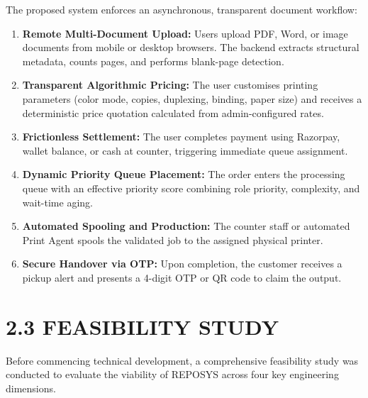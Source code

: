 \documentclass[12pt,a4paper,oneside]{report}
\begin{document}
The proposed system enforces an asynchronous, transparent document workflow:
\begin{enumerate}[leftmargin=0.35in, itemsep=2pt]
  \item \textbf{Remote Multi-Document Upload:} Users upload PDF, Word, or image documents from mobile or desktop browsers. The backend extracts structural metadata, counts pages, and performs blank-page detection.
  \item \textbf{Transparent Algorithmic Pricing:} The user customises printing parameters (color mode, copies, duplexing, binding, paper size) and receives a deterministic price quotation calculated from admin-configured rates.
  \item \textbf{Frictionless Settlement:} The user completes payment using Razorpay, wallet balance, or cash at counter, triggering immediate queue assignment.
  \item \textbf{Dynamic Priority Queue Placement:} The order enters the processing queue with an effective priority score combining role priority, complexity, and wait-time aging.
  \item \textbf{Automated Spooling and Production:} The counter staff or automated Print Agent spools the validated job to the assigned physical printer.
  \item \textbf{Secure Handover via OTP:} Upon completion, the customer receives a pickup alert and presents a 4-digit OTP or QR code to claim the output.
\end{enumerate}

\section{2.3 FEASIBILITY STUDY}
Before commencing technical development, a comprehensive feasibility study was conducted to evaluate the viability of REPOSYS across four key engineering dimensions.
\end{document}
